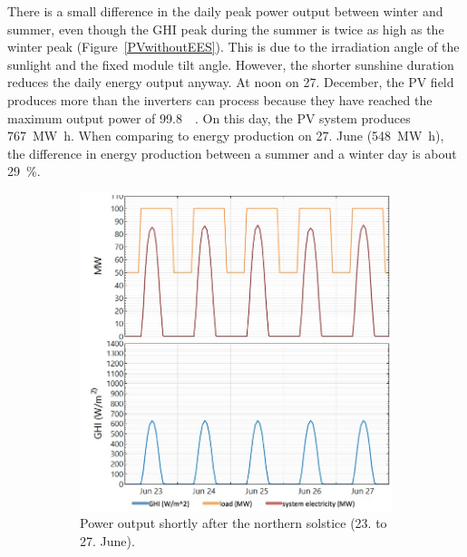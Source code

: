 There is a small difference in the daily peak power output between winter and summer, even though the GHI peak during the summer is twice as high as the winter peak (Figure~\ref{PVwithoutEES}). This is due to the irradiation angle of the sunlight and the fixed module tilt angle. However, the shorter sunshine duration reduces the daily energy output anyway. At noon on 27. December, the PV field produces more than the inverters can process because they have reached the maximum output power of \SI{99.8}{\mega\wattsac}. On this day, the PV system produces \SI{767}{\mega\watt\hour}. When comparing to energy production on 27. June (\SI{548}{\mega\watt\hour}), the difference in energy production between a summer and a winter day is about \SI{29}{\percent}.


\begin{figure}[!htbp]
        \centering                
        \begin{subfigure}[b]{0.5\textwidth}
                \centering
                \includegraphics[width=1\textwidth]{FIG/PVwithoutEESwinter}
                \caption{Power output shortly after the northern solstice (23. to 27. June).}\label{PVwithoutEESwinter}
        \end{subfigure}%
        ~
        \begin{subfigure}[b]{0.5\textwidth}
                \centering

\end{subfigure}
\end{figure}
